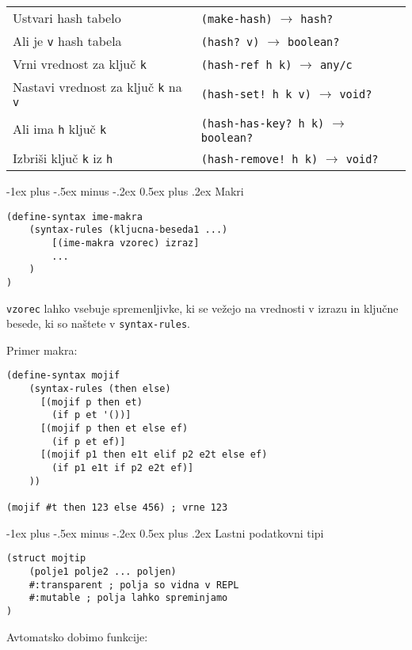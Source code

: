 \documentclass[a3paper,9pt]{extarticle}
\makeatletter
\renewcommand{\section}{\@startsection{section}{1}{0mm}%
                                {-1ex plus -.5ex minus -.2ex}%
                                {0.5ex plus .2ex}%
                                {\normalfont\large\bfseries}}
\makeatother
\begin{document}
\begin{multicols}{4}
\begin{tabular}{@{}p{3.3cm}l@{}}
    Ustvari hash tabelo & \lstinline|(make-hash)| $\rightarrow$ \lstinline|hash?|\\
    Ali je \lstinline|v| hash tabela & \lstinline|(hash? v)| $\rightarrow$ \lstinline|boolean?|\\
    Vrni vrednost za ključ \lstinline|k| & \lstinline|(hash-ref h k)| $\rightarrow$ \lstinline|any/c|\\
    Nastavi vrednost za ključ \lstinline|k| na \lstinline|v| & \lstinline|(hash-set! h k v)| $\rightarrow$ \lstinline|void?|\\
    Ali ima \lstinline|h| ključ \lstinline|k| & \lstinline|(hash-has-key? h k)| $\rightarrow$ \lstinline|boolean?|\\
    Izbriši ključ \lstinline|k| iz \lstinline|h| & \lstinline|(hash-remove! h k)| $\rightarrow$ \lstinline|void?|\\
\end{tabular}

\section{Makri}
\begin{lstlisting}
(define-syntax ime-makra
    (syntax-rules (kljucna-beseda1 ...) 
        [(ime-makra vzorec) izraz]
        ...
    )
)
\end{lstlisting}

\lstinline|vzorec| lahko vsebuje spremenljivke, ki se vežejo na vrednosti v izrazu in ključne besede, ki so naštete v \lstinline|syntax-rules|.

Primer makra:
\begin{lstlisting}
(define-syntax mojif
    (syntax-rules (then else)
      [(mojif p then et) 
        (if p et '())]
      [(mojif p then et else ef)
        (if p et ef)]
      [(mojif p1 then e1t elif p2 e2t else ef)
        (if p1 e1t if p2 e2t ef)]
    ))

(mojif #t then 123 else 456) ; vrne 123
\end{lstlisting}

\section{Lastni podatkovni tipi}
\begin{lstlisting}
(struct mojtip 
    (polje1 polje2 ... poljen) 
    #:transparent ; polja so vidna v REPL
    #:mutable ; polja lahko spreminjamo
)
\end{lstlisting}
Avtomatsko dobimo funkcije:


\end{multicols}
\end{document}

